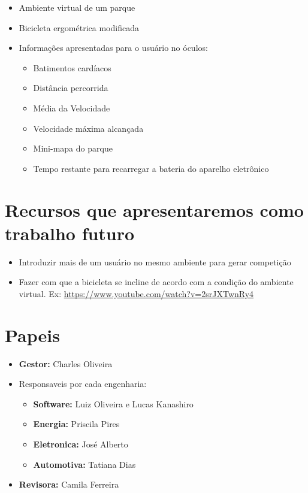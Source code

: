 \begin{itemize}
	\item Ambiente virtual de um parque
	\item Bicicleta ergométrica modificada
	\item Informações apresentadas para o usuário no óculos:
	\begin{itemize}
		\item Batimentos cardíacos
		\item Distância percorrida
		\item Média da Velocidade
		\item Velocidade máxima alcançada
		\item Mini-mapa do parque		
		\item Tempo restante para recarregar a bateria do aparelho eletrônico
	\end{itemize}
\end{itemize}

\section{Recursos que apresentaremos como trabalho futuro}

\begin{itemize}
	\item Introduzir mais de um usuário no mesmo ambiente para gerar competição
	\item Fazer com que a bicicleta se incline de acordo com a condição do ambiente virtual. Ex: \url{https://www.youtube.com/watch?v=2srJXTwnRy4}
\end{itemize}


\section{Papeis}

\begin{itemize}
	\item \textbf{Gestor:} Charles Oliveira
	\item Responsaveis por cada engenharia:
	\begin{itemize}
		\item 	\textbf{Software:} Luiz Oliveira e Lucas Kanashiro
		\item 	\textbf{Energia:} Priscila Pires
		\item 	\textbf{Eletronica:} José Alberto
		\item 	\textbf{Automotiva:} Tatiana Dias
\end{itemize}
\item \textbf{Revisora:} Camila Ferreira

\end{itemize}